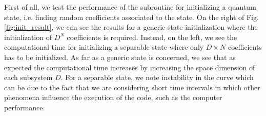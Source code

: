 \documentclass[rmp,10pt,onecolumn,fleqn,notitlepage]{revtex4-1}
\begin{document}
First of all, we test the performance of the subroutine for initializing a quantum state, i.e. finding random coefficients associated to the state. On the right of Fig. \ref{fig:init_result}, we can see the results for a generic state initialization where the initialization of \( D^{N} \) coefficients is required. Instead, on the left, we see the computational time for initializing a separable state where only \( D\times N \) coefficients has to be initialized.
As far as a generic state is concerned, we see that as expected the computational time increases by increasing the space dimension of each subsystem \( D \). For a separable state, we note instability in the curve which can be due to the fact that we are considering short time intervals in which other phenomena influence the execution of the code, such as the computer performance.
\end{document}
